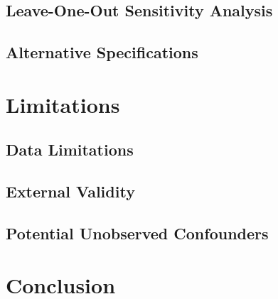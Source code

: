 \documentclass{article}
\begin{document}

\subsection{Leave-One-Out Sensitivity Analysis}


\subsection{Alternative Specifications}


\section{Limitations}

\subsection{Data Limitations}


\subsection{External Validity}


\subsection{Potential Unobserved Confounders}


\section{Conclusion}
\end{document}
